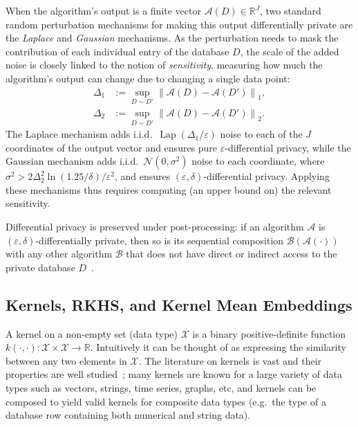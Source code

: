 \documentclass{article}
\newcommand{\Lap}{\operatorname{Lap}}		%
\newcommand{\calA}{\mathcal{A}}			%
\newcommand{\calN}{\mathcal{N}}			%
\newcommand{\calX}{\mathcal{X}}			%
\newcommand{\IR}{\mathbb{R}}  			%
\theoremstyle{plain}
\theoremstyle{remark}
\theoremstyle{definition}
\begin{document}
When the algorithm's output is a finite vector $\calA(D) \in \IR^J$, two standard random perturbation mechanisms for making this output differentially private are the \emph{Laplace} and \emph{Gaussian} mechanisms. As the perturbation needs to mask the contribution of each individual entry of the database $D$, the scale of the added noise is closely linked to the notion of \emph{sensitivity}, measuring how much the algorithm's output can change due to changing a single data point:
\begin{align}
\Delta_1
&:=
\sup_{D \sim D'} \left\| \calA(D) - \calA(D') \right\|_1
,
\\
\Delta_2
&:=
\sup_{D \sim D'} \left\| \calA(D) - \calA(D') \right\|_2
.
\end{align}
The Laplace mechanism adds i.i.d.~$\Lap(\Delta_1 / \varepsilon)$ noise to each of the $J$ coordinates of the output vector and ensures pure $\varepsilon$-differential privacy, while the Gaussian mechanism adds i.i.d.~$\calN(0, \sigma^2)$ noise to each coordinate, where $\sigma^2 > 2 \Delta_2^2 \ln(1.25 / \delta) / \varepsilon^2$, and ensures $(\varepsilon, \delta)$-differential privacy. Applying these mechanisms thus requires computing (an upper bound on) the relevant sensitivity.

Differential privacy is preserved under post-processing: if an algorithm $\calA$ is $(\varepsilon, \delta)$-differentially private, then so is its sequential composition $\mathcal{B}(\calA(\cdot))$ with any other algorithm $\mathcal{B}$ that does not have direct or indirect access to the private database $D$~\cite{dwork_algorithmic_2014}.


\subsection{Kernels, RKHS, and Kernel Mean Embeddings}
\label{sec:background:kernels}

A kernel on a non-empty set (data type) $\calX$ is a binary positive-definite function $k(\cdot, \cdot) : \calX \times \calX \to \IR$.  Intuitively it can be thought of as expressing the similarity between any two elements in $\calX$. The literature on kernels is vast and their properties are well studied~\cite{scholkopf_learning_2001}; many kernels are known for a large variety of data types such as vectors, strings, time series, graphs, etc, and kernels can be composed to yield valid kernels for composite data types (e.g.~the type of a database row containing both numerical and string data).
\end{document}
